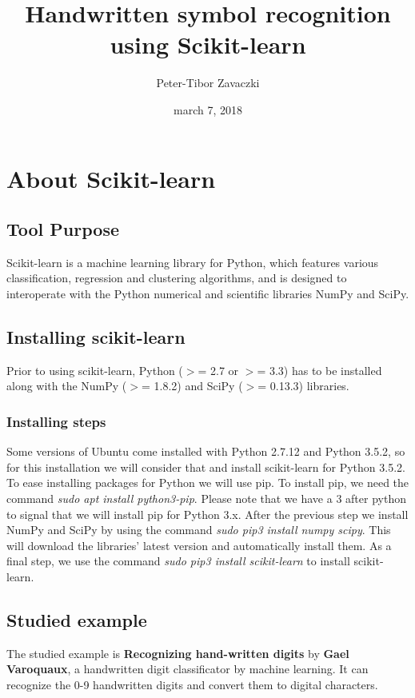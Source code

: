 \documentclass[a4paper,10pt]{report}
\title{
Handwritten symbol recognition using Scikit-learn
}
\author{Peter-Tibor Zavaczki}
\date{march 7, 2018}
\begin{document}
\maketitle

 
\chapter{About Scikit-learn}

 \section{Tool Purpose}
 Scikit-learn is a machine learning library for Python, which features various classification, regression and clustering algorithms, and is designed to interoperate with the Python numerical and scientific libraries NumPy and SciPy.
 
 \section{Installing scikit-learn}
 Prior to using scikit-learn, Python ($>$= 2.7 or $>$= 3.3) has to be installed along with the NumPy ($>$= 1.8.2) and SciPy ($>$= 0.13.3) libraries.

 \subsection{Installing steps}
 Some versions of Ubuntu come installed with Python 2.7.12 and Python 3.5.2, so for this installation we will consider that and install scikit-learn for Python 3.5.2.
 To ease installing packages for Python we will use pip. To install pip, we need the command \textit{sudo apt install python3-pip}. Please note that we have a 3 after python to signal that we will install pip for Python 3.x.
 After the previous step we install NumPy and SciPy by using the command \textit{sudo pip3 install numpy scipy}. This will download the libraries' latest version and automatically install them.
 As a final step, we use the command \textit{sudo pip3 install scikit-learn} to install scikit-learn.

 \section{Studied example}
 The studied example is \textbf{Recognizing hand-written digits} by \textbf{Gael Varoquaux}, a handwritten digit classificator by machine learning. It can recognize the 0-9 handwritten digits and convert them to digital characters.
 
\end{document}
